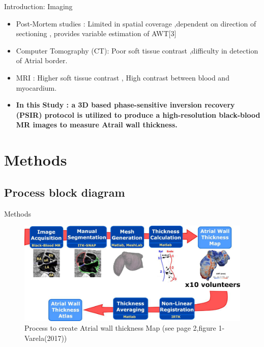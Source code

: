 \documentclass[aspectratio=43]{beamer}
\begin{document}
\newpage
\begin{frame}{Introduction: Imaging }
\normalsize {
\begin{itemize}
\item Post-Mortem studies : Limited in spatial coverage ,dependent on direction of sectioning , provides variable estimation of AWT[3]
\item Computer Tomography (CT): Poor soft tissue contrast ,difficulty in detection of Atrial border.
\item MRI : Higher soft tissue contrast , High contrast between blood and myocardium. 
\item \textbf{In this Study : a 3D based phase-sensitive inversion recovery (PSIR) protocol is utilized to produce a high-resolution black-blood MR images to measure Atrail  wall thickness. }

\end{itemize}
}
\end{frame}

\newpage
\section{Methods}
\subsection{Process block diagram }

\begin{frame}{Methods}
\begin{figure}[h!]	
\includegraphics[width=\linewidth]{img/Pipeline}
\caption{Process to create Atrial wall thickness Map (see page 2,figure 1-Varela(2017))}
\label{Process to create Atrial wall thickness Map  }
\end{figure}
\end{frame}


\newpage
\end{document}
